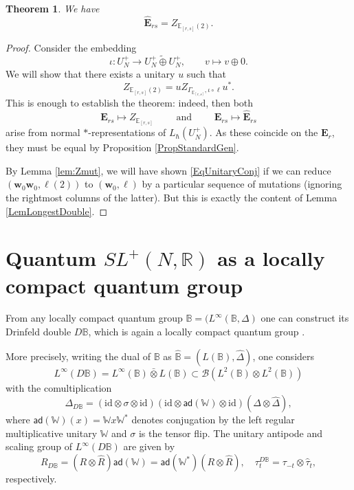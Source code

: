 \documentclass[11pt, reqno]{amsart}
\newtheorem{theorem}{Theorem}[section]
\theoremstyle{definition}
\numberwithin{equation}{section}
\def\R{\mathbb R}
\newcommand{\Bc}{\mathcal{B}}
\newcommand{\eb}{\mathbf{E}}
\newcommand{\Nilp}{U}
\newcommand{\id}{\mathrm{id}}
\newcommand{\Wbb}{\mathbb{W}}
\newcommand{\Bbbb}{\mathbb{B}}
\newcommand*{\ad}{\mathsf{ad}}
\def\stgE{\mathbf{E}}
\newcommand{\bbE}{\mathbb{E}}
\begin{document}
\begin{theorem}
We have 
\[
\hat{\stgE}_{rs} = 
Z_{\bbE_{[r,s]}(2)}.
\]
\end{theorem} 
\begin{proof}
Consider the embedding 
\begin{equation}
\iota \colon \Nilp_N^+ \rightarrow\Nilp_N^+\widetilde{\oplus} \Nilp_N^+,\qquad v \mapsto v \oplus 0. 
\end{equation}
We will show that there exists a unitary $u$ such that
\begin{equation}\label{EqUnitaryConj}
Z_{\bbE_{[r,s]}(2)} = u Z_{\Gamma_{\bbE_{[r,s]}},\iota \circ \ell} u^*.
\end{equation}
This is enough to establish the theorem: indeed, then both 
\[
\stgE_{rs} \mapsto Z_{\bbE_{[r,s]}}\qquad \textrm{ and }\qquad \stgE_{rs}\mapsto \hat{\stgE}_{rs}
\]
arise from normal $*$-representations of $L_{\hbar}(\Nilp_N^+)$. As these coincide on the $\eb_r$, they must be equal by  Proposition \ref{PropStandardGen}. 

By Lemma \ref{lem:Zmut}, we will have shown \eqref{EqUnitaryConj} if we can reduce $(\mathbf{w}_0\mathbf{w}_0,\ell(2))$ to $(\mathbf{w}_0,\ell)$ by a particular sequence of mutations (ignoring the rightmost columns of the latter). But this is exactly the content of Lemma \ref{LemLongestDouble}. 
\end{proof}




\section{Quantum  \texorpdfstring{$SL^+(N,\R)$}{special linear group} as a locally compact quantum group}

From any locally compact quantum group $ \Bbbb = (L^{\infty}(\Bbbb,\Delta)$ one can construct its Drinfeld double $D\Bbbb$, which is again a locally compact quantum group \cite{BV05}. 

More precisely, writing the dual of $\Bbbb$ as $\hat{\Bbbb} = (L(\Bbbb),\hat{\Delta})$, one considers
\[
L^\infty(D\Bbbb) = L^\infty(\Bbbb) \bar{\otimes} L(\Bbbb) \subset \Bc(L^2(\Bbbb)\otimes L^2(\Bbbb))
\]
with the comultiplication 
\[
\Delta_{D\Bbbb} = (\id \otimes \sigma \otimes \id)(\id \otimes \ad(\Wbb) \otimes \id)(\Delta \otimes \hat{\Delta}),
\]
where $ \ad(\Wbb)(x) = \Wbb x \Wbb^* $ denotes conjugation by the left regular multiplicative unitary $ \Wbb $ and $ \sigma $ is the tensor flip. The unitary antipode and scaling group of $ L^\infty(D\Bbbb) $ are given by 
\[
R_{D\Bbbb} = (R \otimes \hat{R}) \ad(\Wbb) = \ad(\Wbb^*) (R \otimes \hat{R}), \quad 
\tau^{D\Bbbb}_t = \tau_{-t} \otimes \hat{\tau}_t,  
\]
respectively. 
\end{document}
